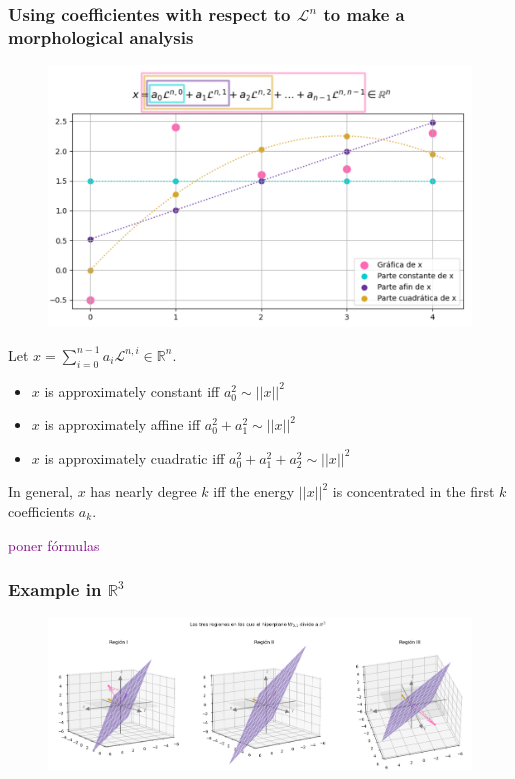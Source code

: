 \documentclass[]{beamer}
\theoremstyle{definition}
\newcommand{\TODO}[1]{\textcolor{purple}{#1}}
\newcommand{\IR}{\mathbb{R}}
\newcommand{\suma}[3]{\sum\limits_{#1}^{#2}#3} %
\newcommand{\cali}[1]{\mathcal{#1}} %
\begin{document}
\begin{frame}
\frametitle{Using coefficientes with respect to $\cali{L}^{n}$ to make a morphological analysis}
\begin{figure}[h]
\includegraphics[scale = 0.35]{abee}
\end{figure}
\end{frame}



\begin{frame}
Let $x = \suma{i=0}{n-1}{a_{i}\cali{L}^{n,i}} \in \IR^{n}$.
\begin{itemize}
	\item $x$ is approximately constant iff $a_{0}^{2} \sim ||x||^{2}$ 
	\item $x$ is approximately affine iff $a_{0}^{2} + a_{1}^{2} \sim ||x||^{2}$ 
	\item $x$ is approximately cuadratic iff $a_{0}^{2} + a_{1}^{2} + a_{2}^{2} \sim ||x||^{2}$ 
\end{itemize}

In general, $x$ has nearly degree $k$ iff the energy 
$||x||^{2}$ is concentrated in the first $k$ coefficients $a_{k}$.

\TODO{poner fórmulas}
\end{frame}

\begin{frame}
\frametitle{Example in $\IR^{3}$}
\begin{figure}[h]
\includegraphics[scale = 0.3]{2Dic_4}
\end{figure}
\end{frame}
\end{document}
